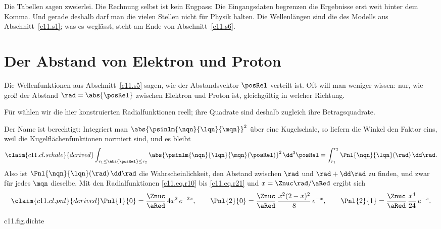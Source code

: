 \begin{vertiefung}
  Die Tabellen sagen zweierlei. Die Rechnung selbst ist kein Engpass: Die Eingangsdaten
  begrenzen die Ergebnisse erst weit hinter dem Komma. Und gerade deshalb darf man die
  vielen Stellen nicht für Physik halten. Die Wellenlängen sind die des Modells aus
  Abschnitt~\ref{c11.s1}; was es weglässt, steht am Ende von Abschnitt~\ref{c11.s6}.
\end{vertiefung}

\section{Der Abstand von Elektron und Proton}\label{c11.s7}

Die Wellenfunktionen aus Abschnitt~\ref{c11.s5} sagen, wie der Abstandsvektor $\posRel$
verteilt ist. Oft will man weniger wissen: nur, wie groß der Abstand
$\rad = \abs{\posRel}$ zwischen Elektron und Proton ist, gleichgültig in welcher
Richtung.

Für  wählen wir die hier konstruierten Radialfunktionen reell; ihre
Quadrate sind deshalb zugleich ihre Betragsquadrate.


Der Name ist berechtigt: Integriert man $\abs{\psinlm{\nqn}{\lqn}{\mqn}}^2$ über eine
Kugelschale, so liefern die Winkel den Faktor eins, weil die Kugelflächenfunktionen
normiert sind, und es bleibt
\begin{equation}\label{c11.eq.schale}\claim{c11.cl.schale}{derived}
  \int_{r_1 \leq \abs{\posRel} \leq r_2} \abs{\psinlm{\nqn}{\lqn}{\mqn}(\posRel)}^2\,\dd^3\posRel
  = \int_{r_1}^{r_2} \Pnl{\nqn}{\lqn}(\rad)\,\dd\rad .
\end{equation}
Also ist $\Pnl{\nqn}{\lqn}(\rad)\,\dd\rad$ die Wahrscheinlichkeit, den Abstand zwischen
$\rad$ und $\rad + \dd\rad$ zu finden, und zwar für jedes $\mqn$ dieselbe. Mit den
Radialfunktionen \eqref{c11.eq.r10} bis \eqref{c11.eq.r21} und $x = \Znuc\rad/\aRed$
ergibt sich
\begin{equation}\label{c11.eq.pnl}\claim{c11.cl.pnl}{derived}
  \Pnl{1}{0} = \frac{\Znuc}{\aRed}\,4x^2\,e^{-2x},
  \qquad
  \Pnl{2}{0} = \frac{\Znuc}{\aRed}\,\frac{x^2(2 - x)^2}{8}\,e^{-x},
  \qquad
  \Pnl{2}{1} = \frac{\Znuc}{\aRed}\,\frac{x^4}{24}\,e^{-x} .
\end{equation}

\begin{tpcfigure}{c11.fig.dichte}
  \caption{Die radialen Aufenthaltsdichten \eqref{c11.eq.pnl} für $\Znuc = 1$.
    Durchgezogen 1s, gestrichelt 2s, strichpunktiert 2p. Die gepunktete Linie markiert
    das Maximum von $\Pnl{1}{0}$ bei $\rad = \aRed$, der Punkt den Knoten von
    $\Pnl{2}{0}$ bei $\rad = 2\aRed$. Die kurzen Striche unter der Achse sind die
    mittleren Abstände \eqref{c11.eq.mittel}. Alle Kurven beginnen bei null, auch die
    der s-Zustände: Der Faktor $\rad^2$ kommt vom Volumen der Kugelschale.}
\end{tpcfigure}


